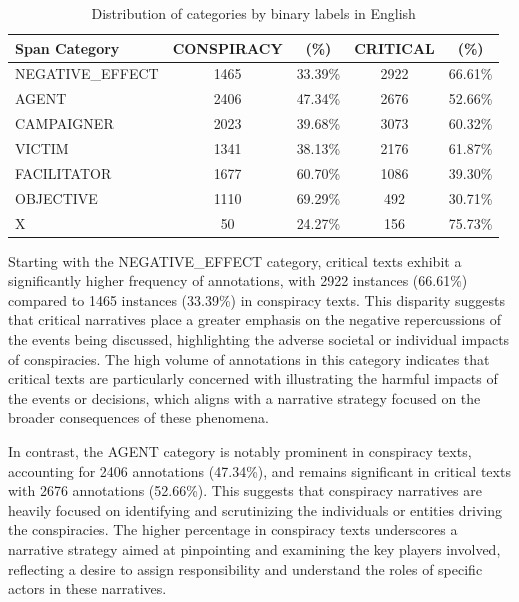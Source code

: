 \documentclass{Configuration_Files/PoliMi3i_thesis}
\begin{document}
\begin{table}[H]
 \centering
 \begin{tabular}{lcccc}
 \hline
 \textbf{Span Category}     & \textbf{CONSPIRACY} & \textbf{(\%)} & \textbf{CRITICAL} & \textbf{(\%)} \\
 \hline
 NEGATIVE\_EFFECT  & 1465      & 33.39\%     & 2922    & 66.61\%    \\
 AGENT             & 2406      & 47.34\%     & 2676    & 52.66\%  \\
 CAMPAIGNER        & 2023      & 39.68\%     & 3073    & 60.32\%  \\
 VICTIM            & 1341      & 38.13\%     & 2176    & 61.87\%  \\
 FACILITATOR       & 1677      & 60.70\%     & 1086    & 39.30\%  \\
 OBJECTIVE         & 1110      & 69.29\%     & 492     & 30.71\%  \\
 X                 & 50        & 24.27\%     & 156     & 75.73\%  \\
 \hline
 \end{tabular}
 \caption{Distribution of categories by binary labels in English}
 \label{tab:distribution_categories_by_binary_labels_en}
\end{table}
\FloatBarrier

Starting with the NEGATIVE\_EFFECT category, critical texts exhibit a significantly higher frequency of annotations, with 2922 instances (66.61\%) compared to 1465 instances (33.39\%) in conspiracy texts. This disparity suggests that critical narratives place a greater emphasis on the negative repercussions of the events being discussed, highlighting the adverse societal or individual impacts of conspiracies. The high volume of annotations in this category indicates that critical texts are particularly concerned with illustrating the harmful impacts of the events or decisions, which aligns with a narrative strategy focused on the broader consequences of these phenomena.

In contrast, the AGENT category is notably prominent in conspiracy texts, accounting for 2406 annotations (47.34\%), and remains significant in critical texts with 2676 annotations (52.66\%). This suggests that conspiracy narratives are heavily focused on identifying and scrutinizing the individuals or entities driving the conspiracies. The higher percentage in conspiracy texts underscores a narrative strategy aimed at pinpointing and examining the key players involved, reflecting a desire to assign responsibility and understand the roles of specific actors in these narratives.
\end{document}

